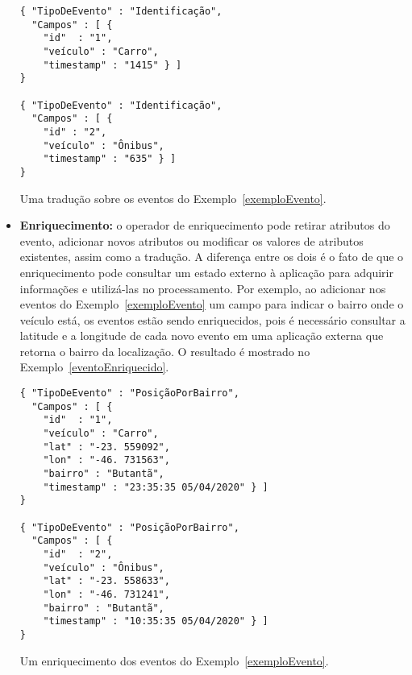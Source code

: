 \begin{itemize}
\begin{evento}[h]
\begin{verbatim}
{ "TipoDeEvento" : "Identificação",
  "Campos" : [ {
    "id"  : "1",
    "veículo" : "Carro",
    "timestamp" : "1415" } ]
}

{ "TipoDeEvento" : "Identificação",
  "Campos" : [ {
    "id" : "2",
    "veículo" : "Ônibus",
    "timestamp" : "635" } ]
}
\end{verbatim}
\caption{Uma tradução sobre os eventos do Exemplo~\ref{exemploEvento}.}
\label{eventoTraduzido}
\end{evento}

\item \textbf{Enriquecimento:} 
o operador de enriquecimento pode retirar atributos do evento, adicionar novos atributos ou modificar os valores de atributos existentes, assim como a tradução. A diferença entre os dois é o fato de que o enriquecimento pode consultar um estado externo à aplicação para adquirir informações e utilizá-las no processamento.
Por exemplo, ao adicionar nos eventos do Exemplo~\ref{exemploEvento} um campo para indicar o bairro onde o veículo está, os eventos estão sendo enriquecidos, pois é necessário consultar a latitude e a longitude de cada novo evento em uma aplicação externa que retorna o bairro da localização. O resultado é mostrado no Exemplo~\ref{eventoEnriquecido}. 
\begin{evento}[h]
\begin{verbatim}
{ "TipoDeEvento" : "PosiçãoPorBairro",
  "Campos" : [ {
    "id"  : "1",
    "veículo" : "Carro",
    "lat" : "-23. 559092",
    "lon" : "-46. 731563",
    "bairro" : "Butantã",
    "timestamp" : "23:35:35 05/04/2020" } ]
}

{ "TipoDeEvento" : "PosiçãoPorBairro",
  "Campos" : [ {
    "id"  : "2",
    "veículo" : "Ônibus",
    "lat" : "-23. 558633",
    "lon" : "-46. 731241",
    "bairro" : "Butantã",
    "timestamp" : "10:35:35 05/04/2020" } ]
}
\end{verbatim}
\caption{Um enriquecimento dos eventos do Exemplo~\ref{exemploEvento}.}
\label{eventoEnriquecido}
\end{evento}


\end{itemize}
